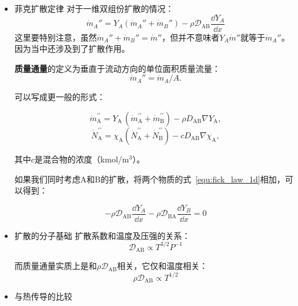 \begin{itemize}
    \item 菲克扩散定律
    对于一维双组份扩散的情况：
    \begin{equation}\label{equ:fick_law_1d}
        \dot{m}_A'' = Y_A(\dot{m}_A'' + \dot{m}_B'') - \rho \mathcal{D}_\mathrm{AB}\frac{\dd Y_A}{\dd x}
    \end{equation}{\tiny 这里要特别注意，虽然\(\dot{m}_A'' + \dot{m}_B''=\dot{m}''\)，但并不意味者\(Y_A \dot{m}''\)就等于\(\dot{m}_A''\)。因为当中还涉及到了扩散作用。}

    \textbf{质量通量}的定义为垂直于流动方向的单位面积质量流量：
    \begin{equation}
        \dot{m}_A'' = \dot{m}_A/A.
    \end{equation}

    可以写成更一般的形式：

    \begin{equation}
        \dot{m}_{\mathrm{A}}^{\prime\prime}=Y_{\mathrm{A}}\,(\dot{m}_{\mathrm{A}}^{\prime\prime}+\dot{m}_{\mathrm{B}}^{\prime\prime})-\rho D_{\mathrm{AB}}\nabla Y_{\mathrm{A}},
    \end{equation}
    \begin{equation}
        \dot{N}_{\mathrm{A}}^{\prime\prime}=\chi_{\mathrm{A}}(\dot{N}_{\mathrm{A}}^{\prime\prime}+\dot{N}_{\mathrm{B}}^{\prime\prime})-c D_{\mathrm{AB}}{\nabla}\chi_{\mathrm{A}},
    \end{equation}
    
    其中\(c\)是混合物的浓度（kmol/m\(^3\)）。

    如果我们同时考虑A和B的扩散，将两个物质的式~\ref{equ:fick_law_1d}相加，可以得到：

    \begin{equation}
        -\rho\mathcal{D}_\mathrm{AB}\frac{\dd Y_A}{\dd x} - \rho\mathcal{D}_\mathrm{BA}\frac{\dd Y_B}{\dd x} = 0
    \end{equation}

    \item 扩散的分子基础
    扩散系数和温度及压强的关系：
    \begin{equation}
        \mathcal{D}_\mathrm{AB} \propto T^{3/2}P^{-1}
    \end{equation}

    而质量通量实质上是和\(\rho \mathcal{D}_\mathrm{AB}\)相关，它仅和温度相关：
    \begin{equation}
        \rho\mathcal{D}_\mathrm{AB}\propto T^{1/2}
    \end{equation}
    \item 与热传导的比较
\end{itemize}

